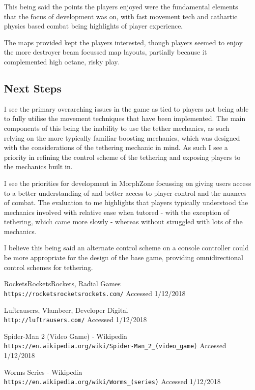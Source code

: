 \documentclass[10pt,a4paper]{article}
\begin{document}
This being said the points the players enjoyed were the fundamental elements that the focus of development was on, with fast movement tech and cathartic physics based combat being highlights of player experience.

The maps provided kept the players interested, though players seemed to enjoy the more destroyer beam focussed map layouts, partially because it complemented high octane, risky play.

\subsection{Next Steps}

I see the primary overarching issues in the game as tied to players not being able to fully utilise the movement techniques that have been implemented. The main components of this being the inability to use the tether mechanics, as such relying on the more typically familiar boosting mechanics, which was designed with the considerations of the tethering mechanic in mind. As such I see a priority in refining the control scheme of the tethering and exposing players to the mechanics built in.

I see the priorities for development in MorphZone focussing on giving users access to a better understanding of and better access to player control and the nuances of combat. The evaluation to me highlights that players typically understood the mechanics involved with relative ease when tutored - with the exception of tethering, which came more slowly - whereas without struggled with lots of the mechanics.

I believe this being said an alternate control scheme on a console controller could be more appropriate for the design of the base game, providing omnidirectional control schemes for tethering.

\begin{thebibliography}{9}
 
RocketsRocketsRockets, Radial Games
\\\texttt{https://rocketsrocketsrockets.com/}
Accessed 1/12/2018

Luftrausers, Vlambeer, Developer Digital
\\\texttt{http://luftrausers.com/}
Accessed 1/12/2018

Spider-Man 2 (Video Game) - Wikipedia
\\\texttt{https://en.wikipedia.org/wiki/Spider-Man\_2\_(video\_game)}
Accessed 1/12/2018

Worms Series - Wikipedia
\\\texttt{https://en.wikipedia.org/wiki/Worms\_(series)}
Accessed 1/12/2018
\end{thebibliography}
\end{document}
